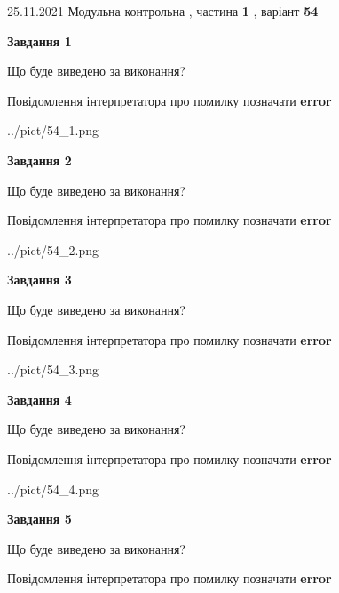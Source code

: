 \documentclass[10pt, ukrainian]{article}
\begin{document}
{25.11.2021 Модульна контрольна , частина \textbf { 1 }, варіант  \No \textbf { 54 }\par}
{
\begin {large}

{\begin {center}\textbf{Завдання 1}\end {center}}\par
Що буде виведено за виконання? \par
Повідомлення інтерпретатора про помилку позначати \textbf{error}

\begin{center}
	{../pict/54_1.png}
\end{center}
\newpage

{\begin {center}\textbf{Завдання 2}\end {center}}\par
Що буде виведено за виконання? \par
Повідомлення інтерпретатора про помилку позначати \textbf{error}

\begin{center}
	{../pict/54_2.png}
\end{center}
\newpage

{\begin {center}\textbf{Завдання 3}\end {center}}\par
Що буде виведено за виконання? \par
Повідомлення інтерпретатора про помилку позначати \textbf{error}

\begin{center}
	{../pict/54_3.png}
\end{center}
\newpage

{\begin {center}\textbf{Завдання 4}\end {center}}\par
Що буде виведено за виконання? \par
Повідомлення інтерпретатора про помилку позначати \textbf{error}

\begin{center}
	{../pict/54_4.png}
\end{center}
\newpage

{\begin {center}\textbf{Завдання 5}\end {center}}\par
Що буде виведено за виконання? \par
Повідомлення інтерпретатора про помилку позначати \textbf{error}


\end{large}}
\end{document}
